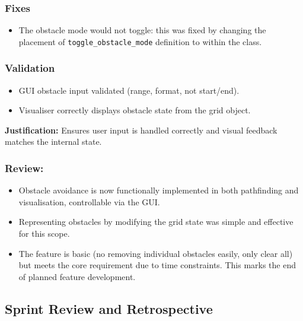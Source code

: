 \subsubsection{Fixes}
\begin{itemize}
	\item The obstacle mode would not toggle: this was fixed by changing the placement of \verb|toggle_obstacle_mode| definition to within the class.
\end{itemize}

\subsubsection{Validation}
\begin{itemize}
	\item GUI obstacle input validated (range, format, not start/end).
	\item Visualiser correctly displays obstacle state from the grid object.
\end{itemize}
\textbf{Justification:} Ensures user input is handled correctly and visual feedback matches the internal state.

\subsubsection{Review:}
\begin{itemize}
	\item Obstacle avoidance is now functionally implemented in both pathfinding and visualisation, controllable via the GUI.
	\item Representing obstacles by modifying the grid state was simple and effective for this scope.
	\item The feature is basic (no removing individual obstacles easily, only clear all) but meets the core requirement due to time constraints. This marks the end of planned feature development.
\end{itemize}

\subsection{Sprint Review and Retrospective}

